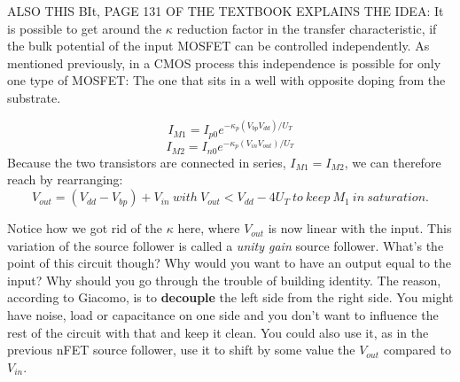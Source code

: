 ALSO THIS BIt, PAGE 131 OF THE TEXTBOOK EXPLAINS THE IDEA: 
It is possible to get around the $\kappa$ reduction factor in the transfer characteristic, if the bulk potential of the input MOSFET can be controlled independently. As mentioned previously, in a CMOS process this independence is possible for only one type of MOSFET: The one that sits in a well with opposite doping from the substrate.

\begin{equation}
I_{M1} = I_{p0}e^{-\kappa_p(V_{bp} V_{dd})/U_T}
\end{equation}
\begin{equation}
I_{M2} = I_{n0}e^{-\kappa_p(V_{in} V_{out})/U_T}
\end{equation}
Because the two transistors are connected in series, $I_{M1} = I_{M2}$, we can therefore reach by rearranging:
\begin{equation}
V_{out} = (V_{dd} - V_{bp}) + V_{in} \ with \ V_{out} < V_{dd} - 4U_T \ to \ keep \ M_1 \ in \ saturation.
\end{equation}

Notice how we got rid of the $\kappa$ here, where $V_{out}$ is now linear with the input. This variation of the source follower is called a \textit{unity gain} source follower. What's the point of this circuit though? Why would you want to have an output equal to the input? Why should you go through the trouble of building identity. The reason, according to Giacomo, is to \textbf{decouple} the left side from the right side. You might have noise, load or capacitance on one side and you don't want to influence the rest of the circuit with that and keep it clean. You could also use it, as in the previous nFET source follower, use it to shift by some value the $V_{out}$ compared to $V_{in}$.
